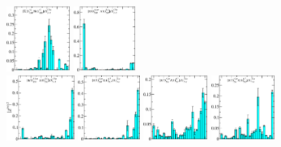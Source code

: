 \begin{figure}[H]
    \hspace{-0.1cm}\includegraphics[width=0.185\textwidth]{figures/sigmas/g1u/zfactors/zfactor_isotriplet_kbar_nucleon-G1u_1-P111-A2-SS_0-P-1-1-1-G-SS_0.pdf}
    \includegraphics[width=0.18\textwidth]{figures/sigmas/g1u/zfactors/zfactor_isotriplet_pion_lambda-G1u_1-P000-A1um-SS_0-P000-G1g-SS_0.pdf}\\
    \includegraphics[width=0.1975\textwidth]{figures/sigmas/g1u/zfactors/zfactor_isotriplet_pion_lambda-G1u_1-P000-A1um-SS_0-P000-G1g-SS_3.pdf}
    \includegraphics[width=0.18\textwidth]{figures/sigmas/g1u/zfactors/zfactor_isotriplet_pion_lambda-G1u_1-P001-A2m-SS_0-P00-1-G1-SS_1.pdf}
    \hspace{-0.1cm}\includegraphics[width=0.185\textwidth]{figures/sigmas/g1u/zfactors/zfactor_isotriplet_pion_lambda-G1u_1-P001-A2m-SS_1-P00-1-G1-SS_1.pdf}
    \hspace{-0.1cm}\includegraphics[width=0.185\textwidth]{figures/sigmas/g1u/zfactors/zfactor_isotriplet_pion_lambda-G1u_1-P001-A2m-SS_1-P00-1-G1-SS_2.pdf}

\end{figure}
